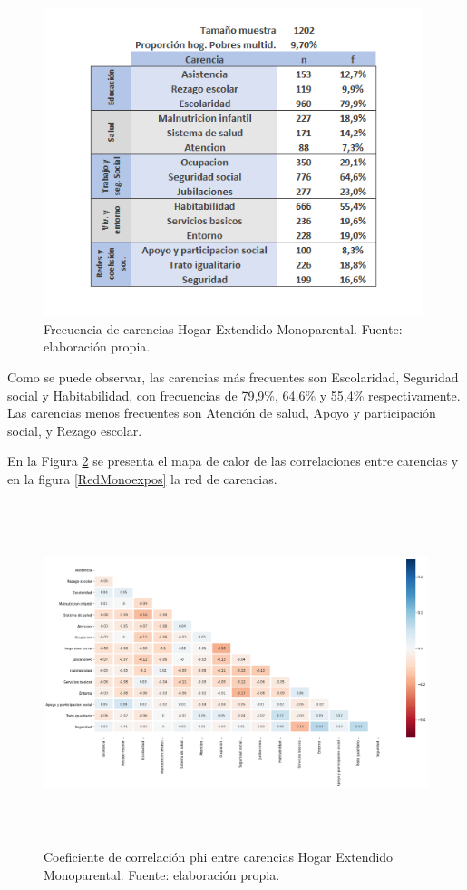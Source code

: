 \documentclass[12pt,letterpaper,spanish]{article}
\begin{document}
\begin{figure}[H]
  \centering
    \includegraphics[height=9cm]{HOGARES/tabla_monoex.png}
    \caption{Frecuencia de carencias Hogar Extendido Monoparental. Fuente: elaboración propia.}
    \label{freMonoex}
\end{figure}
Como se puede observar, las carencias más frecuentes son Escolaridad, Seguridad social y Habitabilidad, con frecuencias de 79,9\%, 64,6\% y 55,4\% respectivamente. Las carencias menos frecuentes son Atención de salud, Apoyo y participación social, y Rezago escolar.

En la Figura \ref{HMMonoex} se presenta el mapa de calor de las correlaciones entre carencias y en la figura \ref{RedMonoexpos} la red de carencias.

\begin{figure}[H]
    \centering
    \includegraphics[height=10cm]{Heatmaps/Heatmap_pearson_car_monoex.png}
    \caption{Coeficiente de correlación phi entre carencias Hogar Extendido Monoparental. Fuente: elaboración propia.}
    \label{HMMonoex}
\end{figure}
\end{document}
